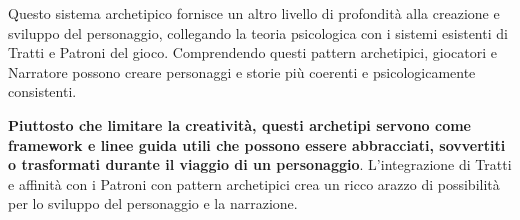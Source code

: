 \begin{multicols}{2}
\begin{changemargin}{0.3cm}{0.3cm}\begin{narratore}
Questo sistema archetipico fornisce un altro livello di profondità alla creazione e sviluppo del personaggio, collegando la teoria psicologica con i sistemi esistenti di Tratti e Patroni del gioco. Comprendendo questi pattern archetipici, giocatori e Narratore possono creare personaggi e storie più coerenti e psicologicamente consistenti.

\textbf{Piuttosto che limitare la creatività, questi archetipi servono come framework e linee guida utili che possono essere abbracciati, sovvertiti o trasformati durante il viaggio di un personaggio}. L'integrazione di Tratti e affinità con i Patroni con pattern archetipici crea un ricco arazzo di possibilità per lo sviluppo del personaggio e la narrazione.
\end{narratore}\end{changemargin}

\end{multicols}

\pagebreak

